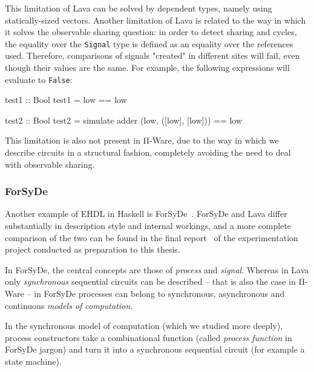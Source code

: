             This limitation of Lava can be solved by dependent types, namely using statically-sized vectors.
            Another limitation of Lava is related to the way in which it solves the observable sharing question:
            in order to detect sharing and cycles, the equality over the \texttt{Signal} type is defined
            as an equality over the references used.
            Therefore, comparisons of signals "created" in different sites will fail,
            even though their values are the same.
            For example, the following expressions will evaluate to \texttt{False}:

            \begin{haskellcode}
        test1 :: Bool
        test1 = low == low

        test2 :: Bool
        test2 = simulate adder (low, ([low], [low])) == low
            \end{haskellcode}

            This limitation is also not present in Π-Ware, due to the way in which we describe circuits
            in a structural fashion, completely avoiding the need to deal with observable sharing.


            \subsubsection{ForSyDe}
            Another example of \ac{EHDL} in Haskell is ForSyDe~\cite{forsyde1999}.
            ForSyDe and Lava differ substantially in description style and internal workings,
            and a more complete comparison of the two can be found
            in the final report~\cite{functional-hardware-survey}
            of the experimentation project conducted as preparation to this thesis.

            In ForSyDe, the central concepts are those of \emph{process} and \emph{signal}.
            Whereas in Lava only \emph{synchronous} sequential circuits can be described – that is
            also the case in Π-Ware – in ForSyDe processes can belong to synchronous,
            asynchronous and continuous \emph{models of computation}.

            In the synchronous model of computation (which we studied more deeply),
            process constructors take a combinational function (called \emph{process function} in
            ForSyDe jargon) and turn it into a synchronous sequential circuit
            (for example a state machine).

